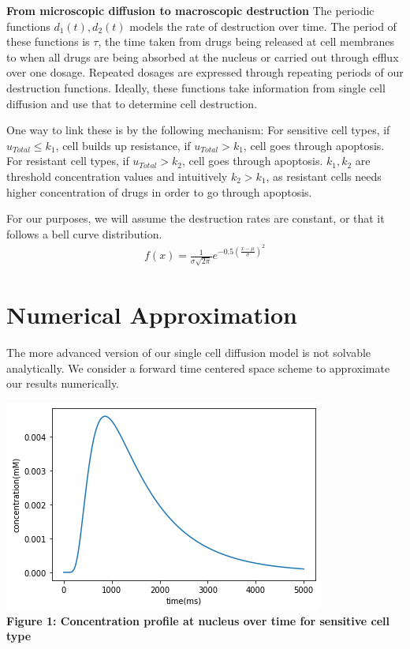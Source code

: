 \documentclass{edm_article}
\begin{document}
\textbf{From microscopic diffusion to macroscopic destruction} The periodic functions $d_1(t), d_2(t)$ models the rate of destruction over time. The period of these functions is $\tau$, the time taken from drugs being released at cell membranes to when all drugs are being absorbed at the nucleus or carried out through efflux over one dosage. Repeated dosages are expressed through repeating periods of our destruction functions. Ideally, these functions take information from single cell diffusion and use that to determine cell destruction. 

One way to link these is by the following mechanism: For sensitive cell types, if $u_{Total} \leq k_1$, cell builds up resistance, if $u_{Total} > k_1$, cell goes through apoptosis. For resistant cell types, if $u_{Total} > k_2$, cell goes through apoptosis. $k_1, k_2$ are threshold concentration values and intuitively $k_2 > k_1$, as resistant cells needs higher concentration of drugs in order to go through apoptosis. 

For our purposes, we will assume the destruction rates are constant, or that it follows a bell curve distribution. 
\begin{align*}
    f(x) = \frac{1}{\sigma\sqrt{2\pi}}e^{-0.5(\frac{x-\mu}{\sigma})^2}
\end{align*}

\section{Numerical Approximation}
The more advanced version of our single cell diffusion model is not solvable analytically. We consider a forward time centered space scheme to approximate our results numerically. 

\includegraphics[scale = 0.6]{sensitive.png}\\
\textbf{Figure 1: Concentration profile at nucleus over time for sensitive cell type}
\end{document}
